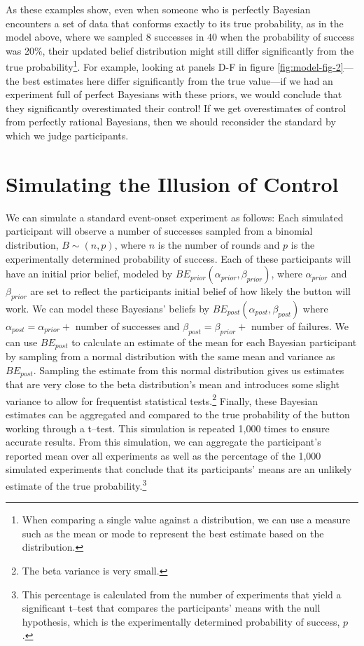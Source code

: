 \documentclass[USenglish,letterpaper,12pt,extrafontsizes,oneside,onecolumn,final]{memoir}
\begin{document}
As these examples show, even when someone who is perfectly Bayesian encounters a set of data that conforms exactly to its true probability, as in the model above, where we sampled 8 successes in 40 when the probability of success was 20\%, their updated belief distribution might still differ significantly from the true probability\footnote{When comparing a single value against a distribution, we can use a measure such as the mean or mode to represent the best estimate based on the distribution.}.   For example, looking at panels D-F in figure \ref{fig:model-fig-2}---the best estimates here differ significantly from the true value---if we had an experiment full of perfect Bayesians with these priors, we would conclude that they significantly overestimated their control!  If we get overestimates of control from perfectly rational Bayesians, then we should reconsider the standard by which we judge participants.

\section{Simulating the Illusion of Control}

We can simulate a standard event-onset experiment as follows: Each simulated participant will observe a number of successes sampled from a binomial distribution, $B \sim (n,p)$, where $n$ is the number of rounds and $p$ is the experimentally determined probability of success.  Each of these participants will have an initial prior belief, modeled by $BE_{prior}(\alpha_{prior},\beta_{prior})$, where $\alpha_{prior}$ and $\beta_{prior}$ are set to reflect the participants initial belief of how likely the button will work.  We can model these Bayesians' beliefs by $BE_{post}(\alpha_{post},\beta_{post})$ where $\alpha_{post} = \alpha_{prior} + $ number of successes and $\beta_{post} = \beta_{prior} +$ number of failures.  We can use $BE_{post}$ to calculate an estimate of the mean for each Bayesian participant by sampling from a normal distribution with the same mean and variance as $BE_{post}$.  Sampling the estimate from this normal distribution gives us estimates that are very close to the beta distribution's mean and introduces some slight variance to allow for frequentist statistical tests.\footnote{The beta variance is very small.}  Finally, these Bayesian estimates can be aggregated and compared to the true probability of the button working through a t--test.  This simulation is repeated 1,000 times to ensure accurate results. From this simulation, we can aggregate the participant's reported mean over all experiments as well as the percentage of the 1,000 simulated experiments that conclude that its participants' means are an unlikely estimate of the true probability.\footnote{This percentage is calculated from the number of experiments that yield a significant t--test that compares the participants' means with the null hypothesis, which is the experimentally determined probability of success, $p$.}
\end{document}
